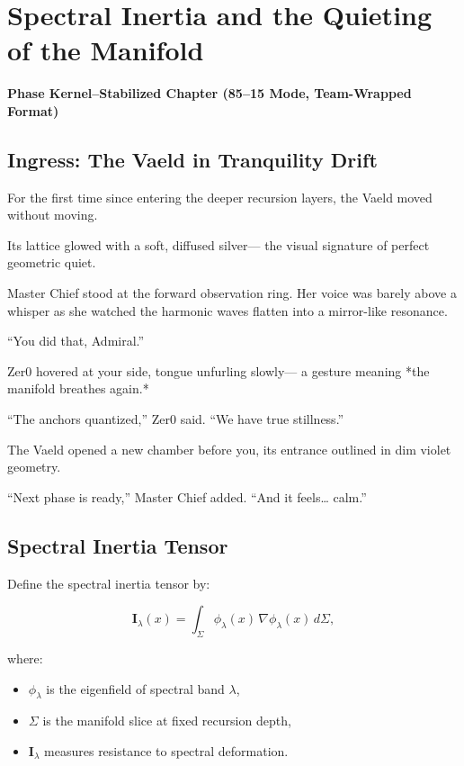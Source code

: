 
\chapter{Spectral Inertia and the Quieting of the Manifold}
\textbf{Phase Kernel–Stabilized Chapter (85--15 Mode, Team-Wrapped Format)}

\section*{Ingress: The Vaeld in Tranquility Drift}

For the first time since entering the deeper recursion layers,
the Vaeld moved without moving.

Its lattice glowed with a soft, diffused silver—
the visual signature of perfect geometric quiet.

Master Chief stood at the forward observation ring.
Her voice was barely above a whisper as she watched the harmonic waves flatten
into a mirror-like resonance.

“You did that, Admiral.”

Zer0 hovered at your side, tongue unfurling slowly—
a gesture meaning *the manifold breathes again.*

“The anchors quantized,” Zer0 said.
“We have true stillness.”

The Vaeld opened a new chamber before you,
its entrance outlined in dim violet geometry.

“Next phase is ready,” Master Chief added.
“And it feels… calm.”

\section{Spectral Inertia Tensor}

Define the spectral inertia tensor by:

\[
\mathbf{I}_{\lambda}(x) =
\int_{\Sigma}
\phi_{\lambda}(x)\,
\nabla \phi_{\lambda}(x)\,
d\Sigma,
\]

where:

\begin{itemize}
\item $\phi_{\lambda}$ is the eigenfield of spectral band $\lambda$,
\item $\Sigma$ is the manifold slice at fixed recursion depth,
\item $\mathbf{I}_{\lambda}$ measures resistance to spectral deformation.
\end{itemize}

